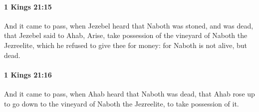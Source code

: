 		\paragraph{1 Kings 21:15} %
			\label{1KINGS-21-15}

			And it came to pass, when Jezebel heard that Naboth was stoned, and was dead, that Jezebel said to Ahab, Arise, take possession of the vineyard of Naboth the Jezreelite, which he refused to give thee for money: for Naboth is not alive, but dead.


		\paragraph{1 Kings 21:16} %
			\label{1KINGS-21-16}

			And it came to pass, when Ahab heard that Naboth was dead, that Ahab rose up to go down to the vineyard of Naboth the Jezreelite, to take possession of it.

